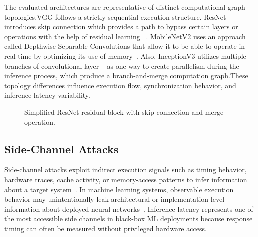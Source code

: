 \documentclass[conference]{IEEEtran}
\begin{document}
The evaluated architectures are representative of distinct computational graph topologies.VGG follows a strictly sequential execution structure. ResNet introduces skip connection which provides a path to bypass certain layers or operations with the help of residual learning ~\cite{resnet}. MobileNetV2 uses an approach called Depthwise Separable Convolutions that allow it to be able to operate in real-time by optimizing its use of memory~\cite{mobilenetv2}. Also, InceptionV3 utilizes multiple branches of convolutional layer ~\cite{inceptionv3} as one way to create parallelism during the inference process, which produce a branch-and-merge computation graph.These topology differences influence execution flow, synchronization behavior, and inference latency variability.

\begin{figure}[t]
\centering
{}
\caption{Simplified ResNet residual block with skip connection and merge operation.}
\label{fig:resnet}
\end{figure}




\subsection{Side-Channel Attacks}

Side-channel attacks exploit indirect execution signals such as timing behavior, hardware traces, cache activity, or memory-access patterns to infer information about a target system~\cite{kocher,host2020}. In machine learning systems, observable execution behavior may unintentionally leak architectural or implementation-level information about deployed neural networks~\cite{deepsniffer,csinn}. Inference latency represents one of the most accessible side channels in black-box ML deployments because response timing can often be measured without privileged hardware access.
\end{document}
